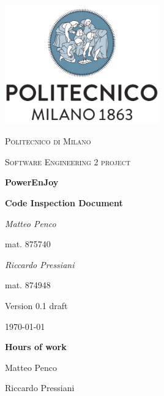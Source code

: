 \documentclass{report}
\begin{document}
\begin{titlepage}
	\centering
	\includegraphics[width=0.5\textwidth]{polimi-logo}\par\vspace{1cm}
	{\scshape\LARGE Politecnico di Milano\par}
	\vspace{1cm}
	{\scshape\Large Software Engineering 2 project\par}
	\vspace{1.5cm}
	{\Huge\bfseries PowerEnJoy\par}
	\vspace{0.5cm}
	{\Large\bfseries Code Inspection Document\par}
	\vspace{2cm}
	\begin{multicols}{2}
		{\Large\itshape Matteo Penco\par}
		\vspace{0.25cm}
		mat. 875740
		\vfill\columnbreak
		{\Large\itshape Riccardo Pressiani\par}
		\vspace{0.25cm}
		mat. 874948
	\end{multicols}
	
	\vfill
	
	{\Large Version 0.1 draft\par}
	\vspace{1.25cm}
	{\large \today\par}
\end{titlepage}

\begin{versionhistory}
\end{versionhistory}

\vspace{5cm}
{\noindent\Huge\bfseries Hours of work\par}
\vspace{0.5cm}
{\noindent Matteo Penco	\par}
{\noindent Riccardo Pressiani \par}

\tableofcontents




\begin{appendices}
	
\end{appendices}




\end{document}
